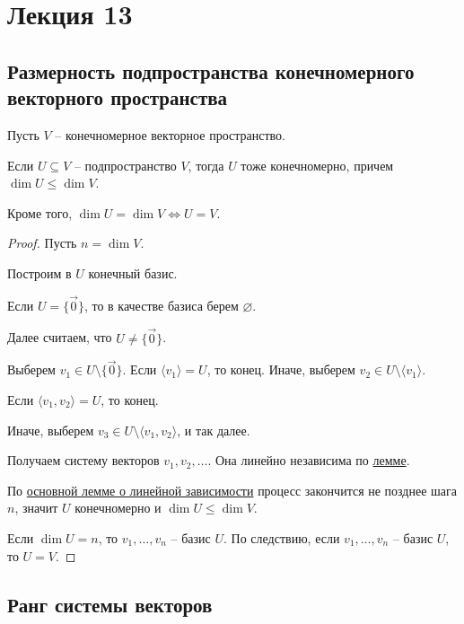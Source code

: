 \section{Лекция 13}


\subsection{Размерность подпространства конечномерного векторного пространства}

Пусть $V$ -- конечномерное векторное пространство.

\begin{proposal}
    Если $U \subseteq V$ -- подпространство $V$, тогда $U$ тоже конечномерно, причем $\dim U \leq \dim V$. 

    Кроме того, $\dim U = \dim V \iff U = V$.
\end{proposal}

\begin{proof}
    Пусть $n = \dim V$.

    Построим в $U$ конечный базис.

    Если $U = \{\overrightarrow{0}\}$, то в качестве базиса берем $\varnothing$.

    Далее считаем, что $U \neq \{\overrightarrow{0}\}$. 

    Выберем $v_1 \in U \setminus \{\overrightarrow{0}\}$. Если $\langle v_1 \rangle = U$, то конец. Иначе, выберем $v_2 \in U \setminus \langle v_1 \rangle$.

    Если $\langle v_1, v_2 \rangle = U$, то конец.

    Иначе, выберем $v_3 \in U \setminus \langle v_1, v_2 \rangle$, и так далее.

    Получаем систему векторов $v_1, v_2, \dots$. Она линейно независима по \hyperref[lec12:lemma]{лемме}.

    \bigskip
    По \hyperref[lec11:osnovnaya_lemma_o_lin_zavisimosti]{основной лемме о линейной зависимости} процесс закончится не позднее шага $n$, значит $U$ конечномерно и $\dim U \leq \dim V$.

    Если $\dim U = n$, то $v_1, \dots, v_n$ -- базис $U$. 
    По следствию, если $v_1, \dots, v_n$ -- базис $U$, то $U = V$.
\end{proof}


\subsection{Ранг системы векторов}

